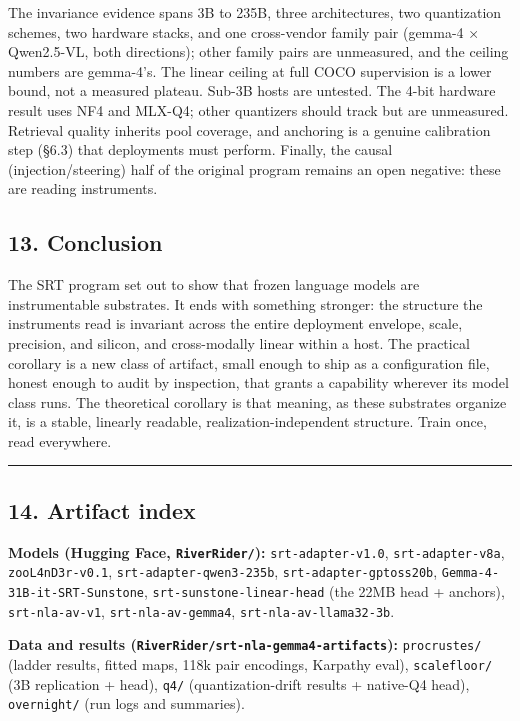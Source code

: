 \documentclass[
  11pt,
]{article}
\begin{document}
The invariance evidence spans 3B to 235B, three architectures, two
quantization schemes, two hardware stacks, and one cross-vendor family
pair (gemma-4 × Qwen2.5-VL, both directions); other family pairs are
unmeasured, and the ceiling numbers are gemma-4's. The linear ceiling at
full COCO supervision is a lower bound, not a measured plateau. Sub-3B
hosts are untested. The 4-bit hardware result uses NF4 and MLX-Q4; other
quantizers should track but are unmeasured. Retrieval quality inherits
pool coverage, and anchoring is a genuine calibration step (§6.3) that
deployments must perform. Finally, the causal (injection/steering) half
of the original program remains an open negative: these are reading
instruments.

\subsection{13. Conclusion}\label{conclusion}

The SRT program set out to show that frozen language models are
instrumentable substrates. It ends with something stronger: the
structure the instruments read is invariant across the entire deployment
envelope, scale, precision, and silicon, and cross-modally linear within
a host. The practical corollary is a new class of artifact, small enough
to ship as a configuration file, honest enough to audit by inspection,
that grants a capability wherever its model class runs. The theoretical
corollary is that meaning, as these substrates organize it, is a stable,
linearly readable, realization-independent structure. Train once, read
everywhere.

\begin{center}\rule{0.5\linewidth}{0.5pt}\end{center}

\subsection{14. Artifact index}\label{artifact-index}

\textbf{Models (Hugging Face, \texttt{RiverRider/}):}
\texttt{srt-adapter-v1.0}, \texttt{srt-adapter-v8a},
\texttt{zooL4nD3r-v0.1}, \texttt{srt-adapter-qwen3-235b},
\texttt{srt-adapter-gptoss20b}, \texttt{Gemma-4-31B-it-SRT-Sunstone},
\texttt{srt-sunstone-linear-head} (the 22MB head + anchors),
\texttt{srt-nla-av-v1}, \texttt{srt-nla-av-gemma4},
\texttt{srt-nla-av-llama32-3b}.

\textbf{Data and results
(\texttt{RiverRider/srt-nla-gemma4-artifacts}):} \texttt{procrustes/}
(ladder results, fitted maps, 118k pair encodings, Karpathy eval),
\texttt{scalefloor/} (3B replication + head), \texttt{q4/}
(quantization-drift results + native-Q4 head), \texttt{overnight/} (run
logs and summaries).
\end{document}
